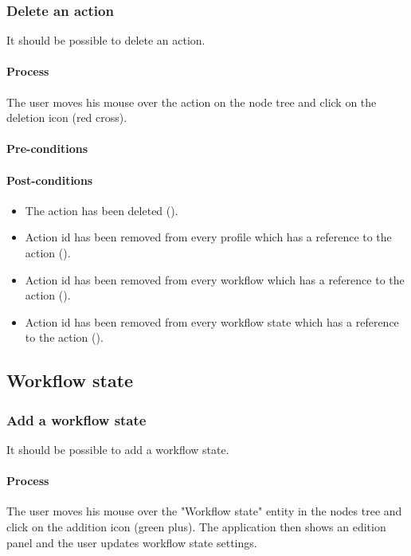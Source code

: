 \documentclass[11pt,a4paper,oneside]{article}
\begin{document}
\subsubsection{Delete an action}
It should be possible to delete an action.

\paragraph{Process}
The user moves his mouse over the action on the node tree and click on the deletion icon (red cross).

\paragraph{Pre-conditions}

\paragraph{Post-conditions}
\begin{itemize}
	\item The action has been deleted ().
	\item Action id has been removed from every profile which has a reference to the action ().
	\item Action id has been removed from every workflow which has a reference to the action ().
	\item Action id has been removed from every workflow state which has a reference to the action ().
\end{itemize}

\subsection{Workflow state}

\subsubsection{Add a workflow state}
It should be possible to add a workflow state.

\paragraph{Process}
The user moves his mouse over the "Workflow state" entity in the nodes tree and click on the addition icon (green plus). The application then shows an edition panel and the user updates workflow state settings.
\end{document}
